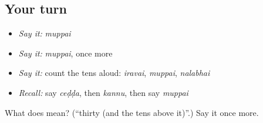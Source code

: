 \subsection*{Your turn}
\begin{itemize}
\raggedright
  \item \emph{Say it:} \emph{muppai}
  \item \emph{Say it:} \emph{muppai}, once more
  \item \emph{Say it:} count the tens aloud: \emph{iravai}, \emph{muppai}, \emph{nalabhai}
  \item \emph{Recall:} say \emph{ceḍḍa}, then \emph{kannu}, then say \emph{muppai}
\end{itemize}

\begin{tcolorbox}[breakable,colback=teal!4,colframe=teal!35!black,title={Before you move on}]
What does  mean? (\textquotedblleft{}thirty (and the tens above it)\textquotedblright{}.) Say it once more.
\end{tcolorbox}
